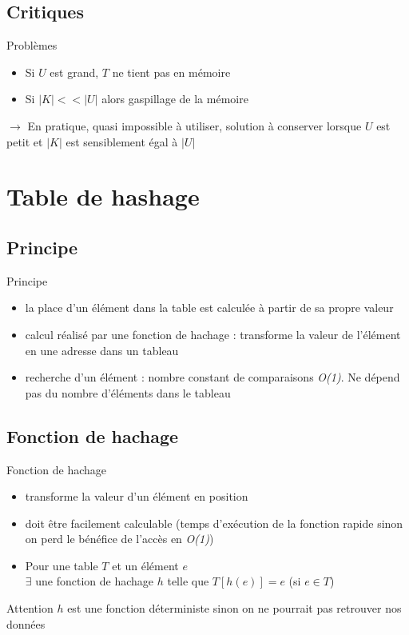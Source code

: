 \documentclass{beamer}
\begin{document}
  \subsection{Critiques}
  \begin{frame}{Problèmes}
    \begin{itemize}
      \item{Si $U$ est grand, $T$ ne tient pas en mémoire}
      \item{Si $|K| << |U|$ alors gaspillage de la mémoire}
    \end{itemize}
    $\rightarrow$ En pratique, quasi impossible à utiliser, solution à conserver
    lorsque $U$ est petit et $|K|$ est sensiblement égal à $|U|$
  \end{frame}


  \section{Table de hashage}
  \subsection{Principe}
  \begin{frame}{Principe}
    \begin{itemize}
      \item{la place d’un élément dans la table est calculée à partir de sa propre valeur}
      \item{calcul réalisé par une fonction de hachage : transforme la valeur de l’élément en une adresse dans un tableau}
      \item{recherche d’un élément : nombre constant de comparaisons \textit{O(1)}. Ne dépend pas du nombre d’éléments dans le tableau}
    \end{itemize}
  \end{frame}

  \subsection{Fonction de hachage}
  \begin{frame}{Fonction de hachage}
    \begin{itemize}
      \item{transforme la valeur d’un élément en position}
      \item{doit être facilement calculable (temps d’exécution de la fonction rapide sinon on perd le bénéfice de l’accès en \textit{O(1)})}
      \item{Pour une table $T$ et un élément $e$\\ $\exists$ une fonction de hachage $h$ telle que $T[h(e)] = e$ (si $e \in T$)}
    \end{itemize}

    \begin{block}{Attention}
      $h$ est une fonction déterministe sinon on ne pourrait
      pas retrouver nos données
    \end{block}
  \end{frame}
\end{document}
